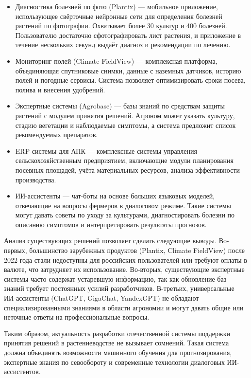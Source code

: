 \documentclass[14pt, a4paper]{extarticle}
\begin{document}
    \begin{itemize}
        \item Диагностика болезней по фото (Plantix) — мобильное приложение, использующее свёрточные нейронные сети для определения болезней растений по фотографии. Охватывает более 30 культур и 400 болезней. Пользователю достаточно сфотографировать лист растения, и приложение в течение нескольких секунд выдаёт диагноз и рекомендации по лечению.
        
        \item Мониторинг полей (Climate FieldView) — комплексная платформа, объединяющая спутниковые снимки, данные с наземных датчиков, историю полей и погодные сервисы. Система позволяет оптимизировать сроки посева, полива и внесения удобрений.
        
        \item Экспертные системы (Agrobase) — базы знаний по средствам защиты растений с модулем принятия решений. Агроном может указать культуру, стадию вегетации и наблюдаемые симптомы, а система предложит список рекомендуемых препаратов.
        
        \item ERP-системы для АПК — комплексные системы управления сельскохозяйственным предприятием, включающие модули планирования посевных площадей, учёта материальных ресурсов, анализа эффективности производства.
        
        \item ИИ-ассистенты — чат-боты на основе больших языковых моделей, отвечающие на вопросы фермеров в диалоговом режиме. Такие системы могут давать советы по уходу за культурами, диагностировать болезни по описанию симптомов и интерпретировать результаты прогнозов.
    \end{itemize}

    Анализ существующих решений позволяет сделать следующие выводы. Во-первых, большинство зарубежных продуктов (Plantix, Climate FieldView) после 2022 года стали недоступны для российских пользователей или требуют оплаты в валюте, что затрудняет их использование. Во-вторых, существующие экспертные системы часто содержат устаревшую информацию, так как обновление баз знаний требует постоянных усилий разработчиков. В-третьих, универсальные ИИ-ассистенты (ChatGPT, GigaChat, YandexGPT) не обладают специализированными знаниями в области агрономии и могут давать общие или неточные ответы на профессиональные вопросы.

    Таким образом, актуальность разработки отечественной системы поддержки принятия решений в растениеводстве не вызывает сомнений. Такая система должна объединять возможности машинного обучения для прогнозирования, экспертные знания по севообороту и современные технологии диалоговых ИИ-ассистентов.
\end{document}
